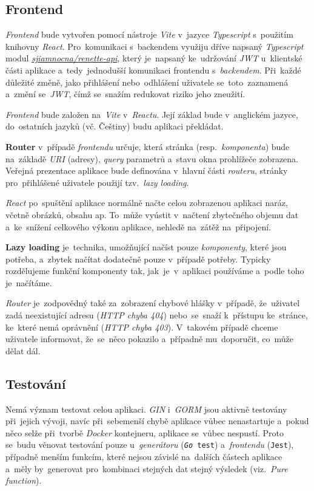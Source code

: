 \documentclass[10pt,a4paper]{article}
\begin{document}
        \subsection{Frontend}
            \emph{Frontend} bude vytvořen pomocí nástroje \emph{Vite} v~jazyce \emph{Typescript} s~použitím knihovny \emph{React}. Pro~komunikaci s~backendem využiju dříve napsaný \emph{Typescript} modul \href{https://gitlab.com/sjiamnocna/renette-api}{\emph{sjiamnocna/renette-api}}, který je~napsaný ke~udržování \emph{JWT} u~klientské části aplikace a~tedy~jednodušší komunikaci frontendu s~\emph{backendem}. Při~každé důležité změně, jako přihlášení nebo~odhlášení uživatele se~toto~zaznamená a~změní se~\emph{JWT}, čímž se~snažím redukovat riziko jeho zneužití.

            \emph{Frontend} bude založen na~\emph{Vite} v~\emph{Reactu}.
            Její základ bude v~anglickém jazyce, do~ostatních jazyků (vč. Češtiny) budu aplikaci překládat.

            \textbf{Router} v~případě \emph{frontendu} určuje, která stránka (resp.~\emph{komponenta}) bude na~základě \emph{URI} (adresy), \emph{query} parametrů a~stavu okna prohlížeče zobrazena. Veřejná prezentace aplikace bude definována v~hlavní části \emph{routeru}, stránky pro~přihlášené uživatele použijí tzv.~\emph{lazy loading}.

            \emph{React} po~spuštění aplikace normálně načte celou zobrazenou aplikaci naráz, včetně obrázků, obsahu ap. To~může vyústit v~načtení zbytečného objemu dat a~ke~snížení celkového výkonu aplikace, nehledě na~zátěž na~připojení.

            \textbf{Lazy loading} je~technika, umožňující načíst pouze \emph{komponenty}, které jsou potřeba, a~zbytek načítat dodatečně pouze v~případě potřeby. Typicky rozdělujeme funkční komponenty tak, jak~je~v~aplikaci používáme a~podle toho je~načítáme.

            \emph{Router} je~zodpovědný také za~zobrazení chybové hlášky v~případě, že~uživatel zadá neexistující adresu (\emph{HTTP chyba 404}) nebo~se~snaží k~přístupu ke~stránce, ke~které nemá oprávnění (\emph{HTTP chyba 403}). V~takovém případě chceme uživatele informovat, že~se~něco pokazilo a~případně mu~doporučit, co~může dělat dál.
            


        \subsection{Testování}
            Nemá význam testovat celou aplikaci. \emph{GIN} i~\emph{GORM} jsou aktivně testovány při~jejich vývoji, navíc při~sebemenší chybě aplikace vůbec nenastartuje a~pokud něco selže při~tvorbě \emph{Docker} kontejneru, aplikace se~vůbec nespustí. Proto se~budu věnovat testování pouze u~\emph{generátoru} (\texttt{\emph{Go} test}) a~\emph{frontendu} (\texttt{Jest}), případně menším funkcím, které nejsou závislé na~dalších částech aplikace a~měly by~generovat pro~kombinaci stejných dat stejný výsledek (viz.~\emph{Pure function}).
\end{document}
